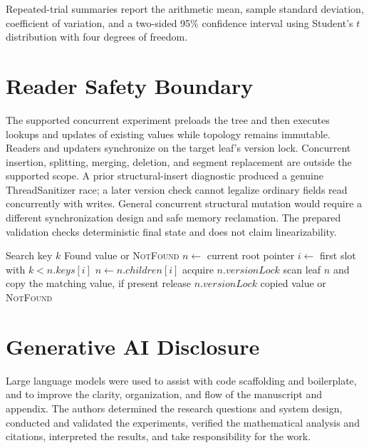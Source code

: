 \documentclass[sigconf,review,anonymous]{acmart}
\begin{document}
Repeated-trial summaries report the arithmetic mean, sample standard
deviation, coefficient of variation, and a two-sided 95\% confidence interval
using Student's $t$ distribution with four degrees of freedom.

\section{Reader Safety Boundary}

The supported concurrent experiment preloads the tree and then executes
lookups and updates of existing values while topology remains immutable.
Readers and updaters synchronize on the target leaf's version lock.  Concurrent
insertion, splitting, merging, deletion, and segment replacement are outside
the supported scope.  A prior structural-insert diagnostic produced a genuine
ThreadSanitizer race; a later version check cannot legalize ordinary fields
read concurrently with writes.  General concurrent structural mutation would
require a different synchronization design and safe memory reclamation.  The
prepared validation checks deterministic final state and does not claim
linearizability.

\begin{algorithm}[t]
\caption{Point lookup for a preloaded, topology-immutable tree}
\label{alg:preloaded-lookup-supp}
\begin{algorithmic}[1]
\Require Search key $k$
\Ensure Found value or \textsc{NotFound}
  \State $n \gets$ current root pointer
    \State $i \gets$ first slot with $k < n.\mathit{keys}[i]$
    \State $n \gets n.\mathit{children}[i]$
  \EndWhile
  \State acquire $n.\mathit{versionLock}$
  \State scan leaf $n$ and copy the matching value, if present
  \State release $n.\mathit{versionLock}$
  \State \Return copied value or \textsc{NotFound}
\end{algorithmic}
\end{algorithm}

\section*{Generative AI Disclosure}
Large language models were used to assist with code scaffolding and
boilerplate, and to improve the clarity, organization, and flow of the
manuscript and appendix.  The authors determined the research questions and
system design, conducted and validated the experiments, verified the
mathematical analysis and citations, interpreted the results, and take
responsibility for the work.
\end{document}
